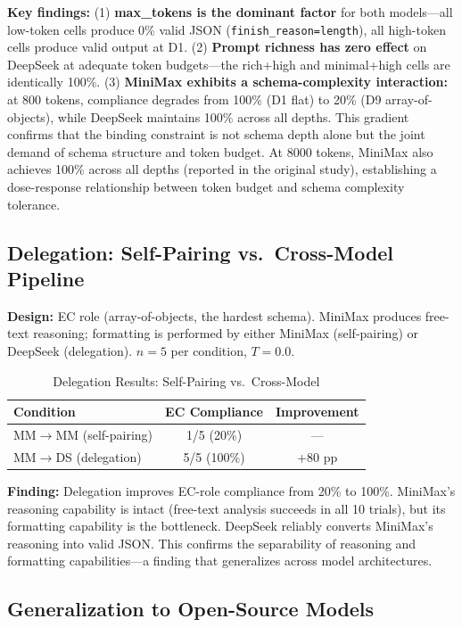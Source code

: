 \documentclass[11pt,a4paper]{article}
\begin{document}
\textbf{Key findings:} (1) \textbf{max\_tokens is the dominant factor} for both models---all low-token cells produce 0\% valid JSON (\texttt{finish\_reason=length}), all high-token cells produce valid output at D1. (2) \textbf{Prompt richness has zero effect} on DeepSeek at adequate token budgets---the rich+high and minimal+high cells are identically 100\%. (3) \textbf{MiniMax exhibits a schema-complexity interaction:} at 800 tokens, compliance degrades from 100\% (D1 flat) to 20\% (D9 array-of-objects), while DeepSeek maintains 100\% across all depths. This gradient confirms that the binding constraint is not schema depth alone but the joint demand of schema structure and token budget. At 8000 tokens, MiniMax also achieves 100\% across all depths (reported in the original study), establishing a dose-response relationship between token budget and schema complexity tolerance.

\subsection{Delegation: Self-Pairing vs.\ Cross-Model Pipeline}

\textbf{Design:} EC role (array-of-objects, the hardest schema). MiniMax produces free-text reasoning; formatting is performed by either MiniMax (self-pairing) or DeepSeek (delegation). $n=5$ per condition, $T=0.0$.

\begin{table}[htbp]\centering\caption{Delegation Results: Self-Pairing vs.\ Cross-Model}\label{tab:delegation}\small
\begin{tabular}{lcc}\toprule\textbf{Condition} & \textbf{EC Compliance} & \textbf{Improvement}\\\midrule
MM$\rightarrow$MM (self-pairing) & 1/5 (20\%) & ---\\
MM$\rightarrow$DS (delegation) & 5/5 (100\%) & +80 pp\\\bottomrule
\end{tabular}
\end{table}

\textbf{Finding:} Delegation improves EC-role compliance from 20\% to 100\%. MiniMax's reasoning capability is intact (free-text analysis succeeds in all 10 trials), but its formatting capability is the bottleneck. DeepSeek reliably converts MiniMax's reasoning into valid JSON. This confirms the separability of reasoning and formatting capabilities---a finding that generalizes across model architectures.

\subsection{Generalization to Open-Source Models}
\end{document}
